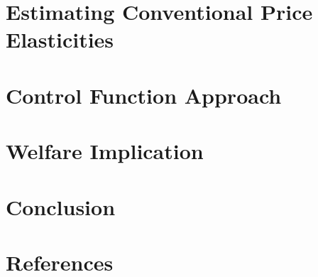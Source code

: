 \documentclass[
  ignorenonframetext,
  aspectratio=169,
]{beamer}
\begin{document}
\hypertarget{estimating-conventional-price-elasticities}{%
\section{Estimating Conventional Price Elasticities}\label{estimating-conventional-price-elasticities}}

\hypertarget{control-function-approach}{%
\section{Control Function Approach}\label{control-function-approach}}

\hypertarget{welfare-implication}{%
\section{Welfare Implication}\label{welfare-implication}}

\hypertarget{conclusion}{%
\section{Conclusion}\label{conclusion}}

\hypertarget{references}{%
\section*{References}\label{references}}
\end{document}
